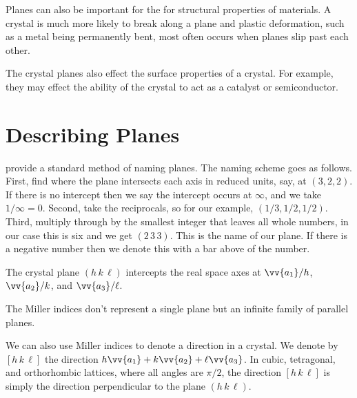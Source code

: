 \documentclass[fleqn]{NotesClass}
\newcommand*{\crystalplane}[3]{(#1\, #2\, #3)}
\newcommand*{\crystaldirection}[3]{[#1\, #2\, #3]}
\begin{document}
    Planes can also be important for the for structural properties of materials.
    A crystal is much more likely to break along a plane and plastic deformation, such as a metal being permanently bent, most often occurs when planes slip past each other.
    
    The crystal planes also effect the surface properties of a crystal.
    For example, they may effect the ability of the crystal to act as a catalyst or semiconductor.
    
    \section{Describing Planes}
     provide a standard method of naming planes.
    The naming scheme goes as follows.
    First, find where the plane intersects each axis in reduced units, say, at \((3, 2, 2)\).
    If there is no intercept then we say the intercept occurs at \(\infty\), and we take \(1/\infty = 0\).
    Second, take the reciprocals, so for our example, \((1/3, 1/2, 1/2)\).
    Third, multiply through by the smallest integer that leaves all whole numbers, in our case this is six and we get \(\crystalplane{2}{3}{3}\).
    This is the name of our plane.
    If there is a negative number then we denote this with a bar above of the number.
    
    The crystal plane \(\crystalplane{h}{k}{\ell}\) intercepts the real space axes at \(\vv{a_1}/h\), \(\vv{a_2}/k\), and \(\vv{a_3}/\ell\).
    
    The Miller indices don't represent a single plane but an infinite family of parallel planes.
    
    We can also use Miller indices to denote a direction in a crystal.
    We denote by \(\crystaldirection{h}{k}{\ell}\) the direction \(h\vv{a_1} + k\vv{a_2} + \ell\vv{a_3}\).
    In cubic, tetragonal, and orthorhombic lattices, where all angles are \(\pi/2\), the direction \(\crystaldirection{h}{k}{\ell}\) is simply the direction perpendicular to the plane \(\crystalplane{h}{k}{\ell}\).
    
\end{document}
